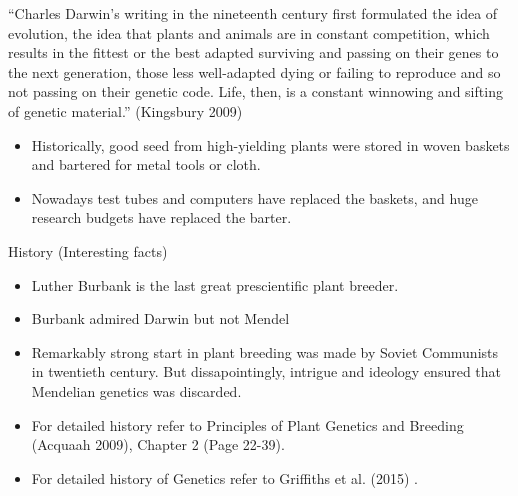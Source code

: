 \documentclass[11pt,ignorenonframetext,aspectratio=169]{beamer}
\begin{document}
\begin{frame}{}
\protect\hypertarget{section-11}{}
``Charles Darwin's writing in the nineteenth century first formulated
the idea of evolution, the idea that plants and animals are in constant
competition, which results in the fittest or the best adapted surviving
and passing on their genes to the next generation, those less
well-adapted dying or failing to reproduce and so not passing on their
genetic code. Life, then, is a constant winnowing and sifting of genetic
material.'' (Kingsbury 2009)
\end{frame}

\begin{frame}{}
\protect\hypertarget{section-12}{}
\begin{itemize}
\item
  Historically, good seed from high-yielding plants were stored in woven
  baskets and bartered for metal tools or cloth.
\item
  Nowadays test tubes and computers have replaced the baskets, and huge
  research budgets have replaced the barter.
\end{itemize}
\end{frame}

\begin{frame}{History (Interesting facts)}
\protect\hypertarget{history-interesting-facts}{}
\begin{itemize}
\item
  Luther Burbank is the last great prescientific plant breeder.
\item
  Burbank admired Darwin but not Mendel
\item
  Remarkably strong start in plant breeding was made by Soviet
  Communists in twentieth century. But dissapointingly, intrigue and
  ideology ensured that Mendelian genetics was discarded.
\item
  For detailed history refer to Principles of Plant Genetics and
  Breeding (Acquaah 2009), Chapter 2 (Page 22-39).
\item
  For detailed history of Genetics refer to Griffiths et al. (2015) .
\end{itemize}
\end{frame}
\end{document}
